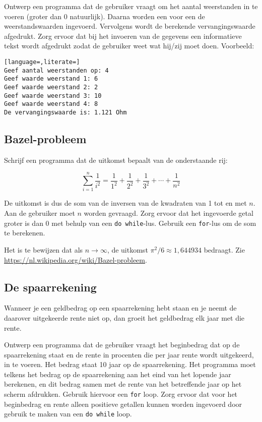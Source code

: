 \documentclass[a4paper,10pt,fleqn,twoside]{article}
\begin{document}
Ontwerp een programma dat de gebruiker vraagt om het aantal weerstanden in te voeren (groter dan 0 natuurlijk). Daarna worden een voor een de weerstandswaarden ingevoerd. Vervolgens wordt de berekende vervangingswaarde afgedrukt. Zorg ervoor dat bij het invoeren van de gegevens een informatieve tekst wordt afgedrukt zodat de gebruiker weet wat hij/zij moet doen. Voorbeeld:

\begin{lstlisting}[language=,literate=]
Geef aantal weerstanden op: 4
Geef waarde weerstand 1: 6
Geef waarde weerstand 2: 2
Geef waarde weerstand 3: 10
Geef waarde weerstand 4: 8
De vervangingswaarde is: 1.121 Ohm
\end{lstlisting}

\subsection{Bazel-probleem }
Schrijf een programma dat de uitkomst bepaalt van de onderstaande rij:

\begin{equation*}
\sum_{i=1}^n \dfrac{1}{i^2} = \dfrac{1}{1^2} + \dfrac{1}{2^2} + \dfrac{1}{3^2} + \cdots + \dfrac{1}{n^2}
\end{equation*}

De uitkomst is dus de som van de inversen van de kwadraten van 1 tot en met $n$. Aan de gebruiker moet $n$ worden gevraagd. Zorg ervoor dat het ingevoerde getal groter is dan 0 met behulp van een \lstinline|do while|-lus. Gebruik een \lstinline|for|-lus om de som te berekenen.

Het is te bewijzen dat als $n\longrightarrow\infty$, de uitkomst $\pi^2/6 \approx 1,644934$ bedraagt. Zie \url{https://nl.wikipedia.org/wiki/Bazel-probleem}.

\subsection{De spaarrekening}
Wanneer je een geldbedrag op een spaarrekening hebt staan en je neemt de daarover uitgekeerde rente niet op, dan groeit het geldbedrag elk jaar met die rente. 

Ontwerp een programma dat de gebruiker vraagt het beginbedrag dat op de spaarrekening staat en de rente in procenten die per jaar rente wordt uitgekeerd, in te voeren. Het bedrag staat 10 jaar op de spaarrekening. Het programma moet telkens het bedrag op de spaarrekening aan het eind van het lopende jaar berekenen, en dit bedrag samen met de rente van het betreffende jaar op het scherm afdrukken. Gebruik hiervoor een \lstinline|for| loop. Zorg ervoor dat voor het beginbedrag en rente alleen positieve getallen kunnen worden ingevoerd door gebruik te maken van een \lstinline|do while| loop.
\end{document}
